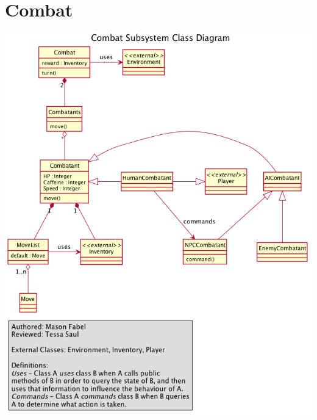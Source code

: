 \documentclass[12pt]{article}
\begin{document}
\section{Combat}
\includegraphics[width=\textwidth]{combat.png}
\end{document}
